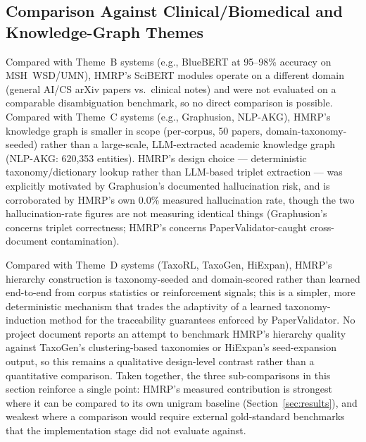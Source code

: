 \documentclass[10pt,conference]{IEEEtran}
\begin{document}
\subsection{Comparison Against Clinical/Biomedical and Knowledge-Graph Themes}
Compared with Theme~B systems (e.g., BlueBERT at 95--98\% accuracy on MSH~WSD/UMN), HMRP's SciBERT modules operate on a different domain (general AI/CS arXiv papers vs.\ clinical notes) and were not evaluated on a comparable disambiguation benchmark, so no direct comparison is possible. Compared with Theme~C systems (e.g., Graphusion, NLP-AKG), HMRP's knowledge graph is smaller in scope (per-corpus, 50 papers, domain-taxonomy-seeded) rather than a large-scale, LLM-extracted academic knowledge graph (NLP-AKG: 620{,}353 entities). HMRP's design choice --- deterministic taxonomy/dictionary lookup rather than LLM-based triplet extraction --- was explicitly motivated by Graphusion's documented hallucination risk, and is corroborated by HMRP's own 0.0\% measured hallucination rate, though the two hallucination-rate figures are not measuring identical things (Graphusion's concerns triplet correctness; HMRP's concerns PaperValidator-caught cross-document contamination).

Compared with Theme~D systems (TaxoRL, TaxoGen, HiExpan), HMRP's hierarchy construction is taxonomy-seeded and domain-scored rather than learned end-to-end from corpus statistics or reinforcement signals; this is a simpler, more deterministic mechanism that trades the adaptivity of a learned taxonomy-induction method for the traceability guarantees enforced by PaperValidator. No project document reports an attempt to benchmark HMRP's hierarchy quality against TaxoGen's clustering-based taxonomies or HiExpan's seed-expansion output, so this remains a qualitative design-level contrast rather than a quantitative comparison. Taken together, the three sub-comparisons in this section reinforce a single point: HMRP's measured contribution is strongest where it can be compared to its own unigram baseline (Section~\ref{sec:results}), and weakest where a comparison would require external gold-standard benchmarks that the implementation stage did not evaluate against.
\end{document}
